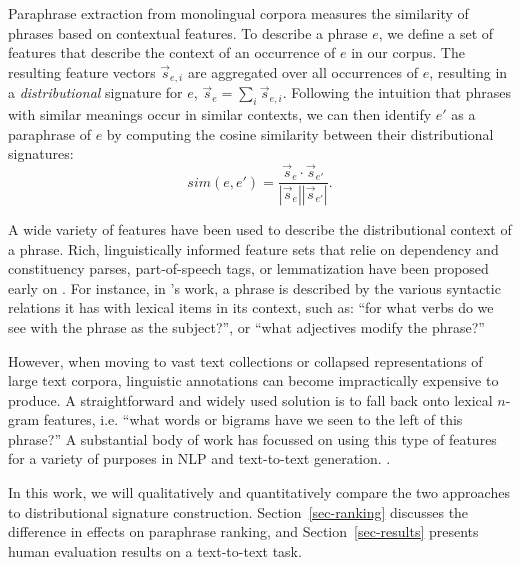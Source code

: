 \documentclass[11pt]{article}
\begin{document}
Paraphrase extraction from monolingual corpora measures the similarity
of phrases based on contextual features. To describe a phrase $e$, we
define a set of features that describe the context of an occurrence of
$e$ in our corpus. The resulting feature vectors $\vec{s}_{e,i}$ are
aggregated over all occurrences of $e$, resulting in a
\emph{distributional} signature for $e$, $\vec{s}_e = \sum_i
\vec{s}_{e,i}$.  Following the intuition that phrases with similar
meanings occur in similar contexts, we can then identify $e'$ as a
paraphrase of $e$ by computing the cosine similarity between their
distributional signatures:
\begin{equation*}
  \mathit{sim}(e, e') = \frac{\vec{s}_e \cdot \vec{s}_{e'}}{|\vec{s}_e||\vec{s}_{e'}|}.
\end{equation*}

A wide variety of features have been used to describe the
distributional context of a phrase. Rich, linguistically informed
feature sets that relie on dependency and constituency parses,
part-of-speech tags, or lemmatization have been proposed early on
\cite{ChurchHanks91,Lin2001}. For instance, in 's
work, a phrase is described by the various syntactic relations it has
with lexical items in its context, such as: ``for what verbs do we see
with the phrase as the subject?'', or ``what adjectives modify the
phrase?''

However, when moving to vast text collections or collapsed
representations of large text corpora, linguistic annotations can
become impractically expensive to produce. A straightforward and
widely used solution is to fall back onto lexical $n$-gram features,
i.e.  ``what words or bigrams have we seen to the left of this
phrase?'' A substantial body of work has focussed on using this type
of features for a variety of purposes in NLP and text-to-text
generation.
\cite{LapataKellerSaLP05,Bhagat2008,LinEtAlLREC10,VanDurmeLallACL10}.

In this work, we will qualitatively and quantitatively compare the two
approaches to distributional signature
construction. Section~\ref{sec-ranking} discusses the difference in
effects on paraphrase ranking, and Section~\ref{sec-results} presents
human evaluation results on a text-to-text task.
\end{document}
